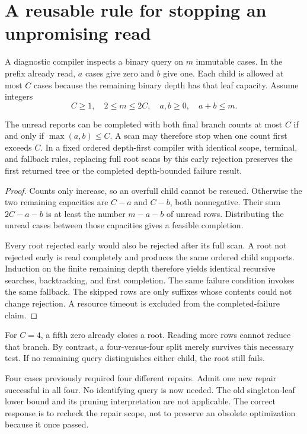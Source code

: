 \section{A reusable rule for stopping an unpromising read}
A diagnostic compiler inspects a binary query on $m$ immutable cases. In the prefix already read, $a$ cases give zero and $b$ give one. Each child is allowed at most $C$ cases because the remaining binary depth has that leaf capacity. Assume integers
\[
C\ge1,\quad 2\le m\le2C,\quad a,b\ge0,\quad a+b\le m.
\]

\begin{proposition}\label{r:prefix}
The unread reports can be completed with both final branch counts at most $C$ if and only if $\max(a,b)\le C$. A scan may therefore stop when one count first exceeds $C$. In a fixed ordered depth-first compiler with identical scope, terminal, and fallback rules, replacing full root scans by this early rejection preserves the first returned tree or the completed depth-bounded failure result.
\end{proposition}
\begin{proof}
Counts only increase, so an overfull child cannot be rescued. Otherwise the two remaining capacities are $C-a$ and $C-b$, both nonnegative. Their sum $2C-a-b$ is at least the number $m-a-b$ of unread rows. Distributing the unread cases between those capacities gives a feasible completion.

Every root rejected early would also be rejected after its full scan. A root not rejected early is read completely and produces the same ordered child supports. Induction on the finite remaining depth therefore yields identical recursive searches, backtracking, and first completion. The same failure condition invokes the same fallback. The skipped rows are only suffixes whose contents could not change rejection. A resource timeout is excluded from the completed-failure claim.
\end{proof}

For $C=4$, a fifth zero already closes a root. Reading more rows cannot reduce that branch. By contrast, a four-versus-four split merely survives this necessary test. If no remaining query distinguishes either child, the root still fails.

\begin{counterexample}\label{ce:universal}
Four cases previously required four different repairs. Admit one new repair successful in all four. No identifying query is now needed. The old singleton-leaf lower bound and its pruning interpretation are not applicable. The correct response is to recheck the repair scope, not to preserve an obsolete optimization because it once passed.
\end{counterexample}

